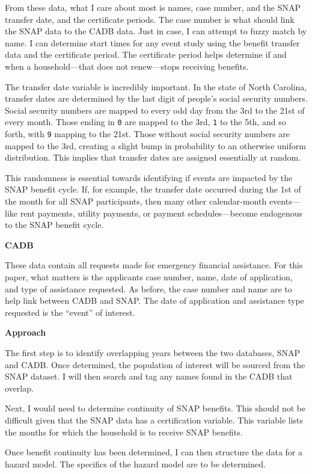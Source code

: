 \documentclass[12pt,letterpaperpaper,]{book}
\begin{document}
From these data, what I care about most is names, case number, and the
SNAP transfer date, and the certificate periods. The case number is what
should link the SNAP data to the CADB data. Just in case, I can attempt
to fuzzy match by name. I can determine start times for any event study
using the benefit transfer data and the certificate period. The
certificate period helps determine if and when a household---that does
not renew---stops receiving benefits.

The transfer date variable is incredibly important. In the state of
North Carolina, transfer dates are determined by the last digit of
people's social security numbers. Social security numbers are mapped to
every odd day from the 3rd to the 21st of every month. Those ending in
\texttt{0} are mapped to the 3rd, \texttt{1} to the 5th, and so forth,
with \texttt{9} mapping to the 21st. Those without social security
numbers are mapped to the 3rd, creating a slight bump in probability to
an otherwise uniform distribution. This implies that transfer dates are
assigned essentially at random.

This randomness is essential towards identifying if events are impacted
by the SNAP benefit cycle. If, for example, the transfer date occurred
during the 1st of the month for all SNAP participants, then many other
calendar-month events---like rent payments, utility payments, or payment
schedules---become endogenous to the SNAP benefit cycle.

\textbf{CADB}

These data contain all requests made for emergency financial assistance.
For this paper, what matters is the applicants case number, name, date
of application, and type of assistance requested. As before, the case
number and name are to help link between CADB and SNAP. The date of
application and assistance type requested is the ``event'' of interest.

\textbf{Approach}

The first step is to identify overlapping years between the two
databases, SNAP and CADB. Once determined, the population of interest
will be sourced from the SNAP dataset. I will then search and tag any
names found in the CADB that overlap.

Next, I would need to determine continuity of SNAP benefits. This should
not be difficult given that the SNAP data has a certification variable.
This variable lists the months for which the household is to receive
SNAP benefits.

Once benefit continuity has been determined, I can then structure the
data for a hazard model. The specifics of the hazard model are to be
determined.
\end{document}
